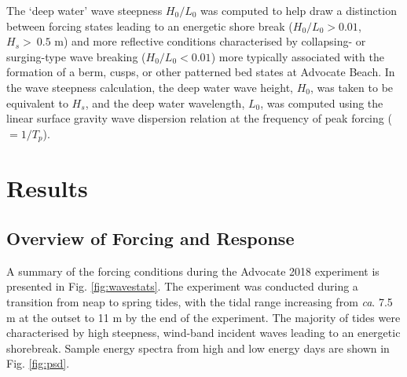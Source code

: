 
The `deep water' wave steepness $H_0/L_0$ was computed to help draw a distinction between forcing states leading to an energetic shore break ($H_0/L_0 > 0.01$, $H_s > ~0.5$ m) and more reflective conditions characterised by collapsing- or surging-type wave breaking ($H_0/L_0 < 0.01$) more typically associated with the formation of a berm, cusps, or other patterned bed states at Advocate Beach. In the wave steepness calculation, the deep water wave height, $H_0$, was taken to be equivalent to $H_s$, and the deep water wavelength, $L_0$, was computed using the linear surface gravity wave dispersion relation at the frequency of peak forcing ($=1/T_p$).


\section{Results}\label{section:ch3_results}

\subsection{Overview of Forcing and Response}\label{subsection:beachMSD}



A summary of the forcing conditions during the Advocate 2018 experiment is presented in Fig. \ref{fig:wavestats}. The experiment was conducted during a transition from neap to spring tides, with the tidal range increasing from \textit{ca}. 7.5 m at the outset to 11 m by the end of the experiment. The majority of tides were characterised by high steepness, wind-band incident waves leading to an energetic shorebreak. Sample energy spectra from high and low energy days are shown in Fig. \ref{fig:psd}.

